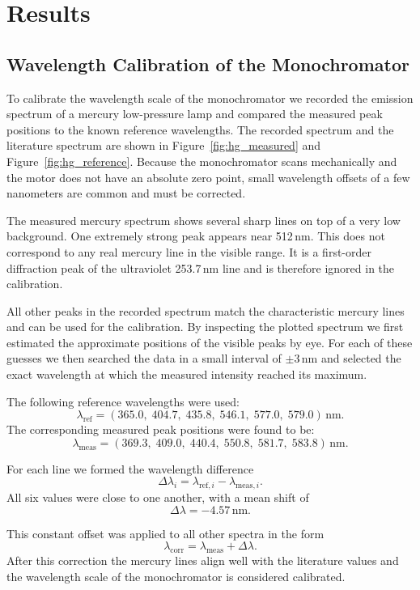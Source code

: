 \documentclass[a4paper]{article}
\begin{document}
\section{Results}
\subsection{Wavelength Calibration of the Monochromator}

To calibrate the wavelength scale of the monochromator we recorded the emission spectrum of a mercury low-pressure lamp and compared the measured peak positions to the known reference wavelengths.
The recorded spectrum and the literature spectrum are shown in Figure~\ref{fig:hg_measured} and Figure~\ref{fig:hg_reference}.
Because the monochromator scans mechanically and the motor does not have an absolute zero point, small wavelength offsets of a few nanometers are common and must be corrected.

The measured mercury spectrum shows several sharp lines on top of a very low background.
One extremely strong peak appears near 512\,nm.
This does not correspond to any real mercury line in the visible range.
It is a first-order diffraction peak of the ultraviolet 253.7\,nm line and is therefore ignored in the calibration.

All other peaks in the recorded spectrum match the characteristic mercury lines and can be used for the calibration.
By inspecting the plotted spectrum we first estimated the approximate positions of the visible peaks by eye.
For each of these guesses we then searched the data in a small interval of $\pm 3$\,nm and selected the exact wavelength at which the measured intensity reached its maximum.

The following reference wavelengths were used:
\[
\lambda_{\mathrm{ref}} = (365.0,\; 404.7,\; 435.8,\; 546.1,\; 577.0,\; 579.0)\,\mathrm{nm}.
\]
The corresponding measured peak positions were found to be:
\[
\lambda_{\mathrm{meas}} = (369.3,\; 409.0,\; 440.4,\; 550.8,\; 581.7,\; 583.8)\,\mathrm{nm}.
\]

For each line we formed the wavelength difference
\[
\Delta\lambda_i = \lambda_{\mathrm{ref},i} - \lambda_{\mathrm{meas},i}.
\]
All six values were close to one another, with a mean shift of
\[
\Delta\lambda = -4.57\,\mathrm{nm}.
\]

This constant offset was applied to all other spectra in the form
\[
\lambda_{\mathrm{corr}} = \lambda_{\mathrm{meas}} + \Delta\lambda.
\]
After this correction the mercury lines align well with the literature values and the wavelength scale of the monochromator is considered calibrated.
\end{document}
